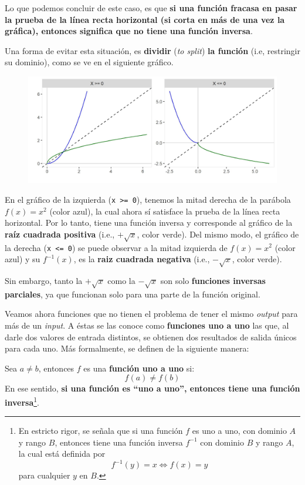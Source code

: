 \documentclass[12pt]{article}
\begin{document}
Lo que podemos concluir de este caso, es que \textbf{si una función fracasa en pasar la prueba de la línea recta horizontal (si corta en más de una vez la gráfica), entonces significa que no tiene una función inversa}.

Una forma de evitar esta situación, es \textbf{dividir} (\textit{to split}) \textbf{la función} (i.e, restringir su dominio), como se ve en el siguiente gráfico.

\begin{figure}[hbt!]
\centering
\includegraphics[scale=0.7]{img/split_not_one_to_one.jpg}
\end{figure}

En el gráfico de la izquierda (\verb|x >= 0|), tenemos la mitad derecha de la parábola $f(x) = x^{2}$ (color azul), la cual ahora sí satisface la prueba de la línea recta horizontal. Por lo tanto, tiene una función inversa y corresponde al gráfico de la \textbf{raíz cuadrada positiva} (i.e., $+\sqrt{x}$, color verde). Del mismo modo, el gráfico de la derecha (\verb|x <= 0|) se puede observar a la mitad izquierda de $f(x) = x^{2}$ (color azul) y su $f^{-1}(x)$, es la \textbf{raiz cuadrada negativa} (i.e., $-\sqrt{x}$, color verde).

Sin embargo, tanto la $+\sqrt{x}$ como la $-\sqrt{x}$ son solo \textbf{funciones inversas parciales}, ya que funcionan solo para una parte de la función original.

Veamos ahora funciones que no tienen el problema de tener el mismo \textit{output} para más de un \textit{input}. A éstas se las conoce como \textbf{funciones uno a uno} las que, al darle dos valores de entrada distintos, se obtienen dos resultados de salida únicos para cada uno. Más formalmente, se definen de la siguiente manera:

Sea $a \neq b$, entonces $f$ es una \textbf{función uno a uno} si:
\[f(a) \neq f(b)\]
En ese sentido, \textbf{si una función es ``uno a uno'', entonces tiene una función inversa}\footnote{En estricto rigor, se señala que si una función $f$ es uno a uno, con dominio $A$ y rango $B$, entonces tiene una función inversa $f^{-1}$ con dominio $B$ y rango $A$, la cual está definida por \[f^{-1}(y) = x \iff f(x) = y\] para cualquier $y$ en $B$.}.
\end{document}
